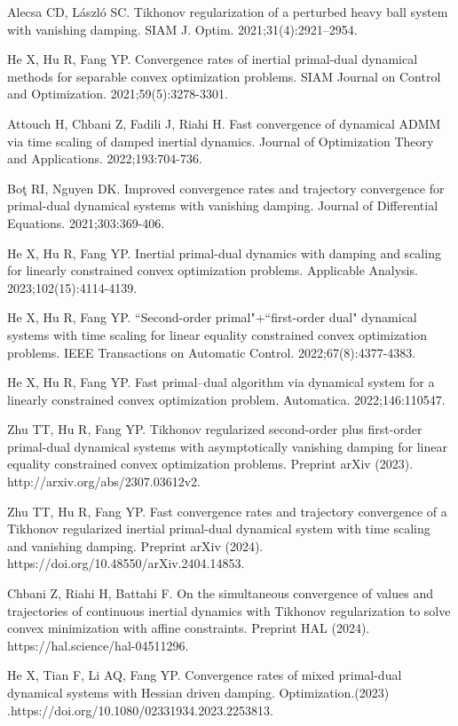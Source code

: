 \documentclass[review]{elsarticle}
\begin{document}
\begin{thebibliography}{}
		Alecsa CD, László SC. Tikhonov regularization of a perturbed heavy ball system with vanishing damping. SIAM J. Optim. 2021;31(4):2921–2954.



		
		He X, Hu R, Fang YP. Convergence rates of inertial primal-dual dynamical methods for separable convex optimization problems. SIAM Journal on Control and Optimization. 2021;59(5):3278-3301.
		
		Attouch H, Chbani Z, Fadili J,  Riahi H. Fast convergence of dynamical ADMM via time scaling of damped inertial dynamics. Journal of Optimization Theory and Applications. 2022;193:704-736.
		
		 Bo{\c t} RI, Nguyen DK. Improved convergence rates and trajectory convergence for primal-dual dynamical systems with vanishing damping. Journal of Differential Equations. 2021;303:369-406.
		
		He X, Hu R, Fang YP. Inertial primal-dual dynamics with damping and scaling for linearly constrained convex optimization problems. Applicable Analysis. 2023;102(15):4114-4139.
		
		
		He X, Hu R, Fang YP. ``Second-order primal"+``first-order dual" dynamical systems with time scaling for linear equality constrained convex optimization problems. IEEE Transactions on Automatic Control. 2022;67(8):4377-4383.
		
		He X, Hu R, Fang YP. Fast primal–dual algorithm via dynamical system for a linearly constrained convex optimization problem. Automatica. 2022;146:110547.
		
		
		

		Zhu TT, Hu R, Fang YP. Tikhonov regularized second-order plus first-order primal-dual dynamical systems with asymptotically vanishing damping for linear equality constrained convex optimization problems. Preprint  arXiv (2023). http://arxiv.org/abs/2307.03612v2.

		Zhu TT, Hu R, Fang YP. Fast convergence rates and trajectory convergence of a Tikhonov regularized inertial primal-dual dynamical system with time scaling and vanishing damping. Preprint arXiv (2024). https://doi.org/10.48550/arXiv.2404.14853.
		
		Chbani Z, Riahi H, Battahi F. On the simultaneous convergence of values and trajectories of continuous inertial dynamics with Tikhonov regularization to solve convex minimization with affine constraints. Preprint HAL (2024). https://hal.science/hal-04511296.
		
				
		
		He X, Tian F, Li AQ, Fang YP. Convergence rates of mixed primal-dual dynamical systems with Hessian driven damping. Optimization.(2023) .https://doi.org/10.1080/02331934.2023.2253813.
		
		
		
		
		
		
		
	\end{thebibliography}
	
\end{document}
